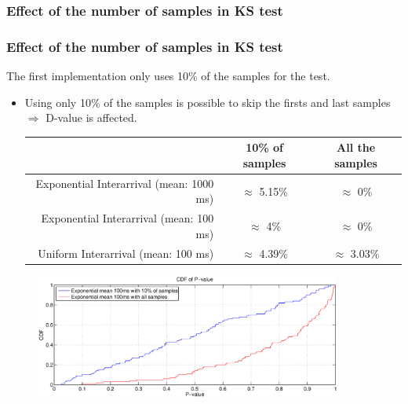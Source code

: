 \documentclass[9pt,handout,serif]{beamer}
\begin{document}
\subsubsection*{Effect of the number of samples in KS test}
\begin{frame}[c]
	\frametitle{Effect of the number of samples in KS test}
	The first implementation only uses 10\% of the samples for the test.
		\begin{itemize}
			\item Using only 10\% of the samples is possible to skip the firsts and last samples $\Rightarrow$ D-value is affected.
			\begin{table}[h!]
				\scriptsize
				\centering
				\begin{tabular}{ r | c | c }
					& 10\% of samples & All the samples \\ \hline
					Exponential Interarrival (mean: 1000 ms) & $\approx$ 5.15\% & $\approx$ 0\% \\ 
					Exponential Interarrival (mean: 100 ms) & $\approx$ 4\% & $\approx$ 0\% \\ 
					Uniform Interarrival (mean: 100 ms) & $\approx$ 4.39\% & $\approx$ 3.03\% \\  
				\end{tabular}
			\end{table}
		\end{itemize}
	\begin{figure}
		\centering
		\includegraphics[width=0.9\textwidth, trim = 0mm 0mm 0mm 0mm, clip]{../images/results/GlobalView/KS/ks_optimization/pvalue_exponential100ms}
	\end{figure}
\end{frame}
\end{document}
